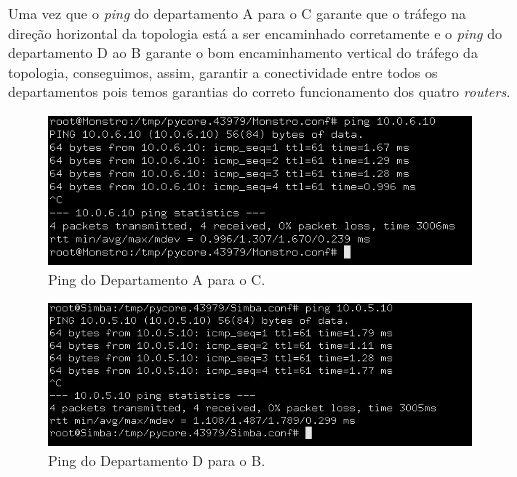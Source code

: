     \par Uma vez que o \textit{ping} do departamento A para o C garante que o tráfego na direção horizontal da topologia está a ser encaminhado corretamente e o \textit{ping} do departamento D ao B garante o bom encaminhamento vertical do tráfego da topologia, conseguimos, assim, garantir a conectividade entre todos os departamentos pois temos garantias do correto funcionamento dos quatro \textit{routers}.
    
    \begin{minipage}{0.5\linewidth}
    \centering
        \begin{figure}[H]
        \centering
        \includegraphics[width=\linewidth]{images/ParteII/Questao1/parteII-questao1-e-A-C.jpg}
        \caption{Ping do Departamento A para o C.} \label{parteII-questao1-ping-A-C}
        \end{figure}
    \end{minipage}
    \begin{minipage}{0.5\linewidth}
    \centering
        \begin{figure}[H]
        \centering
        \includegraphics[width=\linewidth]{images/ParteII/Questao1/parteII-questao1-e-D-B.jpg}
        \caption{Ping do Departamento D para o B.} \label{parteII-questao1-ping-D-B}
        \end{figure}
    \end{minipage}
    
    
    
    
\paragraph{}
